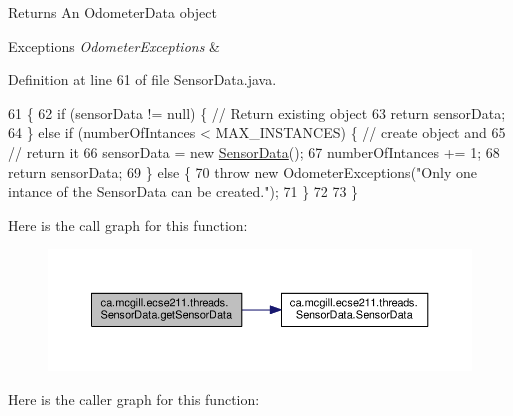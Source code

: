 \begin{DoxyReturn}{Returns}
An Odometer\+Data object 
\end{DoxyReturn}

\begin{DoxyExceptions}{Exceptions}
{\em Odometer\+Exceptions} & \\
\hline
\end{DoxyExceptions}


Definition at line 61 of file Sensor\+Data.\+java.


\begin{DoxyCode}
61                                                                                   \{
62     \textcolor{keywordflow}{if} (sensorData != null) \{ \textcolor{comment}{// Return existing object}
63       \textcolor{keywordflow}{return} sensorData;
64     \} \textcolor{keywordflow}{else} \textcolor{keywordflow}{if} (numberOfIntances < MAX\_INSTANCES) \{ \textcolor{comment}{// create object and}
65                                                    \textcolor{comment}{// return it}
66       sensorData = \textcolor{keyword}{new} \hyperlink{classca_1_1mcgill_1_1ecse211_1_1threads_1_1_sensor_data_a11dcdc9c15184e05a9c84fc3958e26b6}{SensorData}();
67       numberOfIntances += 1;
68       \textcolor{keywordflow}{return} sensorData;
69     \} \textcolor{keywordflow}{else} \{
70       \textcolor{keywordflow}{throw} \textcolor{keyword}{new} OdometerExceptions(\textcolor{stringliteral}{"Only one intance of the SensorData can be created."});
71     \}
72 
73   \}
\end{DoxyCode}
Here is the call graph for this function\+:\nopagebreak
\begin{figure}[H]
\begin{center}
\leavevmode
\includegraphics[width=350pt]{classca_1_1mcgill_1_1ecse211_1_1threads_1_1_sensor_data_a8260aba53b4474ca1275e4ce26157977_cgraph}
\end{center}
\end{figure}
Here is the caller graph for this function\+:\nopagebreak
